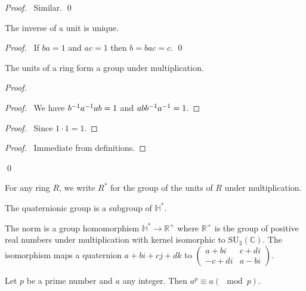 \begin{proof}
\pf\ Similar. \qed
\end{proof}

\begin{prop}
The inverse of a unit is unique.
\end{prop}

\begin{proof}
\pf\ If $ba = 1$ and $ac = 1$ then $b = bac = c$. \qed
\end{proof}

\begin{prop}
The units of a ring form a group under multiplication.
\end{prop}

\begin{proof}
\pf
{}
\begin{proof}
	\pf\ We have ${b}^{-1} {a}^{-1} a b = 1$ and $ab {b}^{-1} {a}^{-1} = 1$.
\end{proof}
\begin{proof}
	\pf\ Since $1 \cdot 1 = 1$.
\end{proof}
\begin{proof}
	\pf\ Immediate from definitions.
\end{proof}
\qed
\end{proof}

\begin{df}
For any ring $R$, we write $R^*$ for the group of the units of $R$ under multiplication.
\end{df}

\begin{ex}
The quaternionic group is a subgroup of $\mathbb{H}^*$.
\end{ex}

\begin{ex}
The norm is a group homomorphism $\mathbb{H}^* \rightarrow \mathbb{R}^+$ where $\mathbb{R}^+$ is the group of positive real numbers under multiplication with kernel isomorphic to $\mathrm{SU}_2(\mathbb{C})$. The isomorphism maps a quaternion $a + bi + cj + dk$ to $\left( \begin{array}{cc}
a + bi & c + di \\ -c + di & a - bi
\end{array} \right)$.
\end{ex}

\begin{thm}
Let $p$ be a prime number and $a$ any integer. Then $a^p \equiv a (\mod p)$.
\end{thm}

